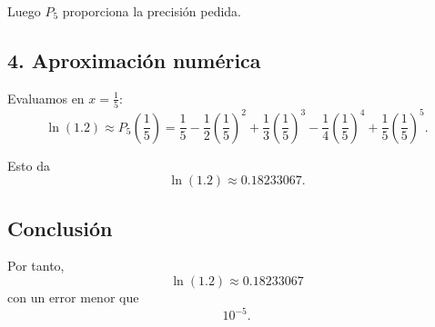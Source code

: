 \documentclass[12pt]{article}
\begin{document}
Luego \(P_5\) proporciona la precisión pedida.

\subsection*{4. Aproximación numérica}

Evaluamos en \(x=\frac{1}{5}\):
\[
\ln(1.2)\approx P_5\left(\frac{1}{5}\right)
=
\frac{1}{5}
-\frac{1}{2}\left(\frac{1}{5}\right)^2
+\frac{1}{3}\left(\frac{1}{5}\right)^3
-\frac{1}{4}\left(\frac{1}{5}\right)^4
+\frac{1}{5}\left(\frac{1}{5}\right)^5.
\]

Esto da
\[
\ln(1.2)\approx 0.18233067.
\]

\subsection*{Conclusión}

Por tanto,
\[
\boxed{\ln(1.2)\approx 0.18233067}
\]
con un error menor que
\[
10^{-5}.
\]
\end{document}
